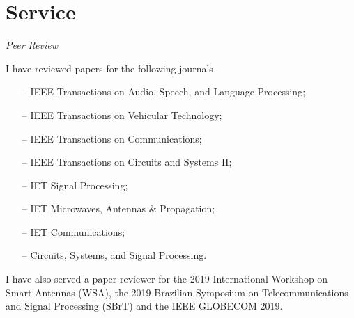 \section{Service} 

{\sl Peer Review}

I have reviewed papers for the following journals
\begin{itemize}
	\item[--] IEEE Transactions on Audio, Speech, and Language Processing;
	\item[--] IEEE Transactions on Vehicular Technology;
	\item[--] IEEE Transactions on Communications;
	\item[--] IEEE Transactions on Circuits and Systems II;
	\item[--] IET Signal Processing;
	\item[--] IET Microwaves, Antennas \& Propagation;
	\item[--] IET Communications;
	\item[--] Circuits, Systems, and Signal Processing.
\end{itemize}
I have also served a paper reviewer for the 2019 International Workshop on Smart Antennas (WSA), the 2019 Brazilian Symposium on Telecommunications and Signal Processing (SBrT) and the IEEE GLOBECOM 2019.